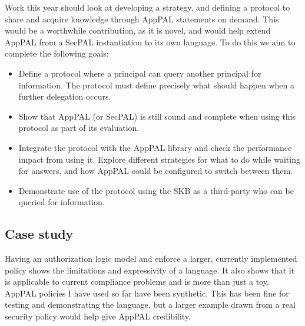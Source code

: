 \documentclass[a4paper]{scrartcl}
\begin{document}
Work this year should look at developing a strategy, and defining a protocol to share and acquire knowledge through AppPAL statements on demand.
This would be a worthwhile contribution, as it is novel, and would help extend AppPAL from a SecPAL instantiation to its own language.
To do this we aim to complete the following goals:
\begin{itemize}
  \item
    Define a protocol where a principal can query another principal for information.
    The protocol must define precisely what should happen when a further delegation occurs.
  \item
    Show that AppPAL (or SecPAL) is still sound and complete when using this protocol as part of its evaluation.
  \item
    Integrate the protocol with the AppPAL library and check the performance impact from using it.
    Explore different strategies for what to do while waiting for answers, and how AppPAL could be configured to switch between them.
  \item
    Demonstrate use of the protocol using the \ac{SKB} as a third-party who can be queried for information.
\end{itemize}

\subsection{Case study}

Having an authorization logic model and enforce a larger, currently implemented policy shows the limitations and expressivity of a language.
It also shows that it is applicable to current compliance problems and is more than just a toy.
AppPAL policies I have used so far have been synthetic.
This has been fine for testing and demonstrating the language, but a larger example drawn from a real security policy would help give AppPAL credibility.
\end{document}
